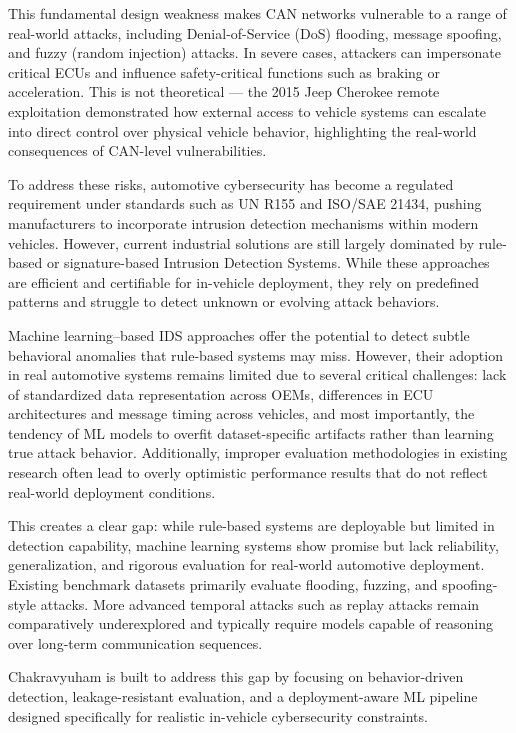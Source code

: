 \documentclass{article}
\begin{document}
This fundamental design weakness makes CAN networks vulnerable to a range of real-world attacks, including Denial-of-Service (DoS) flooding, message spoofing, and fuzzy (random injection) attacks. In severe cases, attackers can impersonate critical ECUs and influence safety-critical functions such as braking or acceleration. This is not theoretical — the 2015 Jeep Cherokee remote exploitation demonstrated how external access to vehicle systems can escalate into direct control over physical vehicle behavior, highlighting the real-world consequences of CAN-level vulnerabilities.

To address these risks, automotive cybersecurity has become a regulated requirement under standards such as UN R155 and ISO/SAE 21434, pushing manufacturers to incorporate intrusion detection mechanisms within modern vehicles. However, current industrial solutions are still largely dominated by rule-based or signature-based Intrusion Detection Systems. While these approaches are efficient and certifiable for in-vehicle deployment, they rely on predefined patterns and struggle to detect unknown or evolving attack behaviors.

Machine learning–based IDS approaches offer the potential to detect subtle behavioral anomalies that rule-based systems may miss. However, their adoption in real automotive systems remains limited due to several critical challenges: lack of standardized data representation across OEMs, differences in ECU architectures and message timing across vehicles, and most importantly, the tendency of ML models to overfit dataset-specific artifacts rather than learning true attack behavior. Additionally, improper evaluation methodologies in existing research often lead to overly optimistic performance results that do not reflect real-world deployment conditions.

This creates a clear gap: while rule-based systems are deployable but limited in detection capability, machine learning systems show promise but lack reliability, generalization, and rigorous evaluation for real-world automotive deployment. Existing benchmark datasets primarily evaluate flooding, fuzzing, and spoofing-style attacks. More advanced temporal attacks such as replay attacks remain comparatively underexplored and typically require models capable of reasoning over long-term communication sequences.

Chakravyuham is built to address this gap by focusing on behavior-driven detection, leakage-resistant evaluation, and a deployment-aware ML pipeline designed specifically for realistic in-vehicle cybersecurity constraints.
\end{document}
